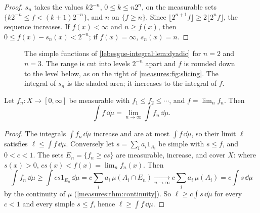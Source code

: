 \begin{notechapter}
\begin{proof}
$s_n$ takes the values $k2^{-n}$, $0\leq k\leq n2^n$, on the measurable
sets $\{k2^{-n}\leq f < (k + 1)2^{-n}\}$, and $n$ on $\{f\geq n\}$. Since
$\lfloor2^{n+1}f\rfloor\geq2\lfloor2^nf\rfloor$, the sequence increases.
If $f(x) < \infty$ and $n\geq f(x)$, then
$0\leq f(x) - s_n(x) < 2^{-n}$; if $f(x) = \infty$, $s_n(x) = n$.
\end{proof}

\begin{figure}[ht]
\centering
{}
\caption{The simple functions of \cref{lebesgue-integral:lem:dyadic}
for $n = 2$ and $n = 3$. The range is cut into levels $2^{-n}$ apart and
$f$ is rounded down to the level below, as on the right of
\cref{measures:fig:slicing}. The integral of $s_n$ is the shaded area;
it increases to the integral of $f$.}
\label{lebesgue-integral:fig:dyadic}
\end{figure}

\begin{theorem}\label{lebesgue-integral:thm:mct}
Let $f_n:X\to[0, \infty]$ be measurable with
$f_1\leq f_2\leq\cdots$, and $f = \lim_nf_n$. Then
\[
  \int f\,\dd\mu = \lim_{n\to\infty}\int f_n\,\dd\mu .
\]
\end{theorem}

\begin{proof}
The integrals $\int f_n\,\dd\mu$ increase and are at most
$\int f\,\dd\mu$, so their limit $\ell$ satisfies
$\ell\leq\int f\,\dd\mu$. Conversely let $s = \sum_ia_i1_{A_i}$ be simple
with $s\leq f$, and $0 < c < 1$. The sets $E_n = \{f_n\geq cs\}$ are
measurable, increase, and cover $X$: where $s(x) > 0$,
$cs(x) < f(x) = \lim_nf_n(x)$. Then
\[
  \int f_n\,\dd\mu\geq\int cs1_{E_n}\,\dd\mu
  = c\sum_ia_i\,\mu(A_i\cap E_n)
  \xrightarrow[n\to\infty]{} c\sum_ia_i\,\mu(A_i) = c\int s\,\dd\mu
\]
by the continuity of $\mu$ (\cref{measures:thm:continuity}). So
$\ell\geq c\int s\,\dd\mu$ for every $c < 1$ and every simple
$s\leq f$, hence $\ell\geq\int f\,\dd\mu$.
\end{proof}


\end{notechapter}
